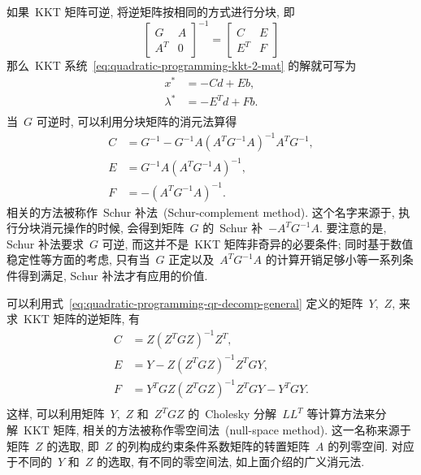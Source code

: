 如果~KKT 矩阵可逆, 将逆矩阵按相同的方式进行分块, 即
\begin{equation}
\label{eq:quadratic-programming-kkt-inverse}
\begin{bmatrix} G & A \\ A^T & 0 \end{bmatrix}^{-1} = \begin{bmatrix} C & E \\ E^T & F \end{bmatrix}
\end{equation}
那么~KKT 系统~\eqref{eq:quadratic-programming-kkt-2-mat} 的解就可写为
\begin{equation}
\label{eq:quadratic-programming-kkt-sol-1}
\begin{aligned}
{x}^* & = - C {d} + E {b}, \\
{\lambda}^* & = - E^T {d} + F {b}. \\
\end{aligned}
\end{equation}
当~$G$ 可逆时, 可以利用分块矩阵的消元法算得
\begin{equation}
\label{eq:quadratic-programming-kkt-inv-1}
\begin{aligned}
C & = G^{-1} - G^{-1} A \left( A^TG^{-1}A \right)^{-1} A^T G^{-1},\\
E & = G^{-1} A \left( A^TG^{-1}A \right)^{-1},\\
F & = - \left( A^TG^{-1}A \right)^{-1}.
\end{aligned}
\end{equation}
相关的方法被称作~Schur 补法~(Schur-complement method). 这个名字来源于, 执行分块消元操作的时候, 会得到矩阵~$G$ 的~Schur 补~$-A^TG^{-1}A.$ 要注意的是, Schur 补法要求~$G$ 可逆, 而这并不是~KKT 矩阵非奇异的必要条件; 同时基于数值稳定性等方面的考虑, 只有当~$G$ 正定以及~$A^TG^{-1}A$ 的计算开销足够小等一系列条件得到满足, Schur 补法才有应用的价值.

可以利用式~\eqref{eq:quadratic-programming-qr-decomp-general} 定义的矩阵~$Y,$ $Z$, 来求~KKT 矩阵的逆矩阵, 有
\begin{equation}
\label{eq:quadratic-programming-kkt-inv-2}
\begin{aligned}
C & = Z \left( Z^T G Z \right)^{-1} Z^T,\\
E & = Y - Z \left( Z^T G Z \right)^{-1} Z^T G Y,\\
F & = Y^T G Z \left( Z^T G Z \right)^{-1} Z^T G Y - Y^T G Y.\\
\end{aligned}
\end{equation}
这样, 可以利用矩阵~$Y,$ $Z$ 和~$Z^T G Z$ 的~Cholesky 分解~$L L^T$ 等计算方法来分解~KKT 矩阵, 相关的方法被称作零空间法~(null-space method). 这一名称来源于矩阵~$Z$ 的选取, 即~$Z$ 的列构成约束条件系数矩阵的转置矩阵~$A$ 的列零空间. 对应于不同的~$Y$ 和~$Z$ 的选取, 有不同的零空间法, 如上面介绍的广义消元法.
